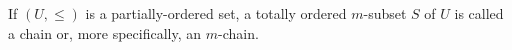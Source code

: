 If $(U, \leq)$ is a partially-ordered set, a totally ordered $m$-subset $S$ of $U$ is called a chain or, more specifically, an $m$-chain.
